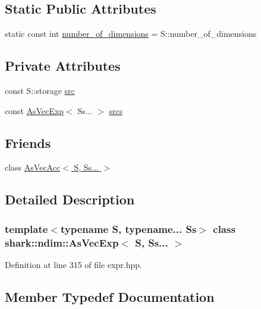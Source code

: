 \subsection*{Static Public Attributes}
\begin{DoxyCompactItemize}
\item 
static const int \hyperlink{classshark_1_1ndim_1_1_as_vec_exp_3_01_s_00_01_ss_8_8_8_01_4_a203536498ce354b29804db9ba83a3c99}{number\+\_\+of\+\_\+dimensions} = S\+::number\+\_\+of\+\_\+dimensions
\end{DoxyCompactItemize}
\subsection*{Private Attributes}
\begin{DoxyCompactItemize}
\item 
const S\+::storage \hyperlink{classshark_1_1ndim_1_1_as_vec_exp_3_01_s_00_01_ss_8_8_8_01_4_a194abf424b594c3e86a42aa114700e51}{src}
\item 
const \hyperlink{classshark_1_1ndim_1_1_as_vec_exp}{As\+Vec\+Exp}$<$ Ss... $>$ \hyperlink{classshark_1_1ndim_1_1_as_vec_exp_3_01_s_00_01_ss_8_8_8_01_4_aed5717d0b843d3fbe4c99a13109fbb6b}{srcs}
\end{DoxyCompactItemize}
\subsection*{Friends}
\begin{DoxyCompactItemize}
\item 
class \hyperlink{classshark_1_1ndim_1_1_as_vec_exp_3_01_s_00_01_ss_8_8_8_01_4_ab3101340c739f2a1cc97a85007fb6caa}{As\+Vec\+Acc$<$ S, Ss... $>$}
\end{DoxyCompactItemize}


\subsection{Detailed Description}
\subsubsection*{template$<$typename S, typename... Ss$>$\newline
class shark\+::ndim\+::\+As\+Vec\+Exp$<$ S, Ss... $>$}



Definition at line 315 of file expr.\+hpp.



\subsection{Member Typedef Documentation}
\hypertarget{classshark_1_1ndim_1_1_as_vec_exp_3_01_s_00_01_ss_8_8_8_01_4_a60c74eff0990f421ce075603e7ed320f}{}\label{classshark_1_1ndim_1_1_as_vec_exp_3_01_s_00_01_ss_8_8_8_01_4_a60c74eff0990f421ce075603e7ed320f} 
